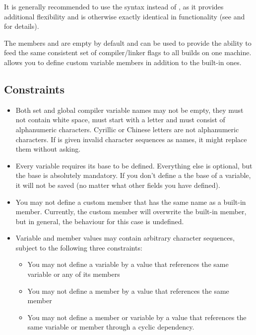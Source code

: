 It is generally recommended to use the syntax  instead of , as it provides additional flexibility and is otherwise exactly identical in functionality (see  and  for details).

The members  and  are empty by default and can be used to provide the ability to feed the same consistent set of compiler/linker flags to all builds on one machine. \codeblocks allows you to define custom variable members in addition to the built-in ones.

\subsection{Constraints}

\begin{itemize}
\item Both set and global compiler variable names may not be empty, they must not contain white space, must start with a letter and must consist of alphanumeric characters. Cyrillic or Chinese letters are not alphanumeric characters. If \codeblocks is given invalid character sequences as names, it might replace them without asking.
\item Every variable requires its base to be defined. Everything else is optional, but the base is absolutely mandatory. If you don't define a the base of a variable, it will not be saved (no matter what other fields you have defined).
\item You may not define a custom member that has the same name as a built-in member. Currently, the custom member will overwrite the built-in member, but in general, the behaviour for this case is undefined.
\item Variable and member values may contain arbitrary character sequences, subject to the following three constraints:
\begin{itemize}
\item You may not define a variable by a value that references the same variable or any of its members
\item You may not define a member by a value that references the same member
\item You may not define a member or variable by a value that references the same variable or member through a cyclic dependency.
\end{itemize}
\end{itemize}

